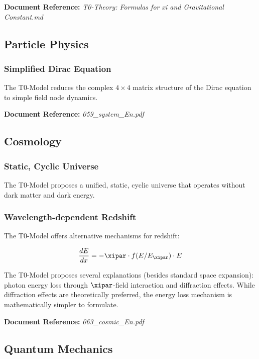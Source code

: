 \textbf{Document Reference:} \textit{T0-Theory: Formulas for xi and Gravitational Constant.md}

\subsection{Particle Physics}

\subsubsection{Simplified Dirac Equation}

The T0-Model reduces the complex $4 \times 4$ matrix structure of the Dirac equation to simple field node dynamics.

\textbf{Document Reference:} \textit{059\_system\_En.pdf}

\subsection{Cosmology}

\subsubsection{Static, Cyclic Universe}

The T0-Model proposes a unified, static, cyclic universe that operates without dark matter and dark energy.

\subsubsection{Wavelength-dependent Redshift}

The T0-Model offers alternative mechanisms for redshift:

\begin{equation}
	\frac{dE}{dx} = -\xipar \cdot f(E/E_\xipar) \cdot E
\end{equation}

The T0-Model proposes several explanations (besides standard space expansion): photon energy loss through $\xipar$-field interaction and diffraction effects. While diffraction effects are theoretically preferred, the energy loss mechanism is mathematically simpler to formulate.

\textbf{Document Reference:} \textit{063\_cosmic\_En.pdf}

\subsection{Quantum Mechanics}

